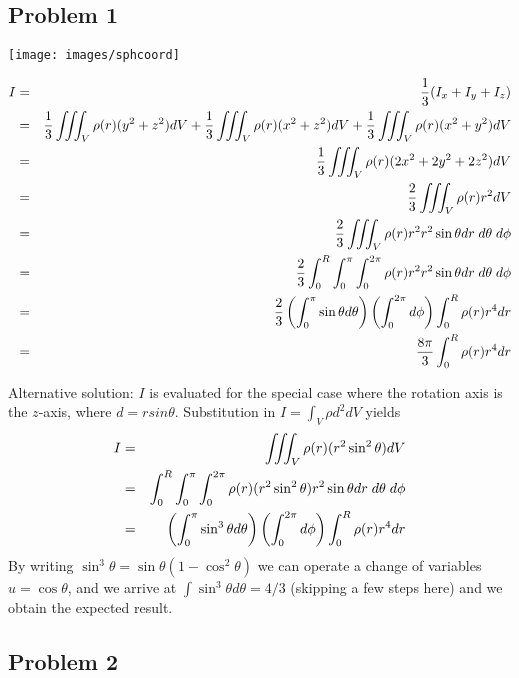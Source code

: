 
\subsection{Problem 1}

\begin{center}
\texttt{[image: images/sphcoord]}
\end{center}

\begin{eqnarray}
I 
&=& \frac{1}{3} (I_x + I_y + I_z ) \nonumber\\
&=& 
\frac{1}{3} \iiint_V \rho(r) (y^2+z^2) dV +
\frac{1}{3} \iiint_V \rho(r) (x^2+z^2) dV +
\frac{1}{3} \iiint_V \rho(r) (x^2+y^2) dV \nonumber\\
&=&
\frac{1}{3} \iiint_V \rho(r) (2x^2 + 2y^2+2z^2) dV \nonumber\\
&=&
\frac{2}{3} \iiint_V \rho(r) r^2 dV \nonumber\\
&=& \frac{2}{3} \iiint_V \rho(r) r^2 r^2 \sin\theta dr \; d\theta \; d\phi \nonumber\\
&=& \frac{2}{3} \int_0^R \int_0^\pi \int_0^{2\pi}    \rho(r) r^2 r^2 \sin\theta dr \; d\theta \; d\phi \nonumber\\
&=& \frac{2}{3} \left(\int_0^\pi \sin\theta d\theta \right)
\left( \int_0^{2\pi} d\phi \right)  \int_0^R   \rho(r) r^4 dr \nonumber\\
&=& \frac{8\pi}{3}  \int_0^R   \rho(r) r^4 dr 
\end{eqnarray}

Alternative solution:
$I$ is evaluated for the special case where the rotation axis is the $z$-axis, 
where $d = r sin\theta$. 
Substitution in $I=\int_V \rho d^2 dV$ yields
\begin{eqnarray}
I
&=& \iiint_V \rho(r) (r^2 \sin^2\theta ) dV  \nonumber\\
&=& \int_0^R \int_0^\pi \int_0^{2\pi} \rho(r) ( r^2 \sin^2\theta ) r^2 \sin\theta dr \; d\theta \; d\phi \nonumber\\
&=& \left(\int_0^\pi \sin^3 \theta d\theta \right)
\left( \int_0^{2\pi} d\phi \right)  \int_0^R   \rho(r) r^4 dr \nonumber
\end{eqnarray}
By writing $\sin^3\theta = \sin\theta (1-\cos^2\theta)$ we can operate a change of variables $u=\cos \theta$,
and we arrive at $\int \sin^3 \theta d\theta=4/3$ (skipping a few steps here) 
and we obtain the expected result.






\newpage
\subsection{Problem 2}

